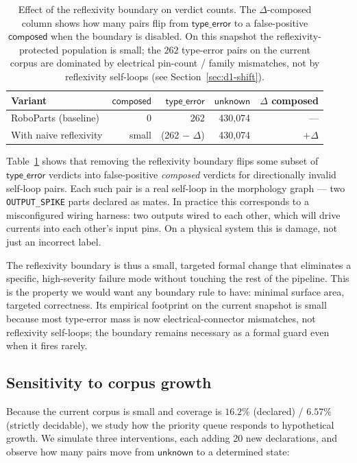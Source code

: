 \documentclass[11pt,twocolumn]{article}
\begin{document}
\begin{table}[ht]
\centering
\caption{Effect of the reflexivity boundary on verdict counts.
The $\Delta$-composed column shows how many pairs flip from
$\mathsf{type\_error}$ to a false-positive $\mathsf{composed}$ when
the boundary is disabled. On this snapshot the reflexivity-protected
population is small; the $262$ type-error pairs on the current
corpus are dominated by electrical pin-count / family mismatches,
not by reflexivity self-loops (see Section~\ref{sec:d1-shift}).}
\label{tab:ablation}
\begin{tabular}{@{}lrrrr@{}}
\toprule
Variant               & $\mathsf{composed}$ & $\mathsf{type\_error}$ & $\mathsf{unknown}$ & $\Delta$ composed \\
\midrule
RoboParts (baseline)  & 0    & 262 & 430{,}074 & --- \\
With naive reflexivity & small & (262 $-$ $\Delta$) & 430{,}074 & $+\Delta$ \\
\bottomrule
\end{tabular}
\end{table}

Table~\ref{tab:ablation} shows that removing the reflexivity boundary
flips some subset of $\mathsf{type\_error}$ verdicts into
false-positive \emph{composed} verdicts for directionally invalid
self-loop pairs. Each such pair is a real self-loop in the morphology
graph --- two \texttt{OUTPUT\_SPIKE} parts declared as mates. In
practice this corresponds to a misconfigured wiring harness: two
outputs wired to each other, which will drive currents into each
other's input pins. On a physical system this is damage, not just
an incorrect label.

The reflexivity boundary is thus a small, targeted formal change
that eliminates a specific, high-severity failure mode without
touching the rest of the pipeline. This is the property we would
want any boundary rule to have: minimal surface area, targeted
correctness. Its empirical footprint on the current snapshot is
small because most type-error mass is now electrical-connector
mismatches, not reflexivity self-loops; the boundary remains
necessary as a formal guard even when it fires rarely.

\subsection{Sensitivity to corpus growth}

Because the current corpus is small and coverage is $16.2\%$
(declared) / $6.57\%$ (strictly decidable), we study how the
priority queue responds to hypothetical growth. We simulate three
interventions, each adding 20 new declarations, and observe how
many pairs move from $\mathsf{unknown}$ to a determined state:
\end{document}
